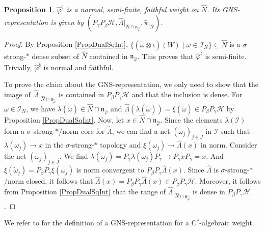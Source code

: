 \documentclass[pdftex]{sigma}
\numberwithin{equation}{section}
\newtheorem{prop}[thm]{Proposition}
\theoremstyle{definition}
\newcommand{\cHil}{\mathcal{H}}
\begin{document}
\begin{prop}\label{PropNSFWeightVNA}
 $\hat{\varphi}^\natural$  is a normal, semi-finite, faithful weight on $\hat{N}$. Its GNS-representation is given by $(P_\gamma P_\beta \cHil, \hat{\Lambda} \vert_{\hat{N} \cap \mathfrak{n}_{\hat{\varphi}}}, \hat{\pi}\vert_{\hat{N}})$.
\end{prop}
\begin{proof}
By Proposition \ref{PropDualSqInt}, $\{ (\tilde{\omega} \otimes \iota)(W) \mid \omega \in \mathcal{I}_N \} \subseteq \hat{N}$ is a $\sigma$-strong-$\ast$ dense subset of $\hat{N}$ contained in $\mathfrak{n}_{\hat{\varphi}}$. This proves that $\hat{\varphi}^\natural$ is semi-f\/inite. Trivially,  $\hat{\varphi}^\natural$ is normal and faithful.

 To prove the claim about the GNS-representation, we only need to show that the image of~$\hat{\Lambda} \vert_{\hat{N} \cap \mathfrak{n}_{\hat{\varphi}}}$ is contained in   $P_\beta P_\gamma \cHil$ and that the inclusion is dense.
For $\omega \in \mathcal{I}_N$, we have $\lambda(\tilde{\omega}) \in \hat{N} \cap \mathfrak{n}_{\hat{\varphi}}$ and $\hat{\Lambda}(\lambda(\tilde{\omega})) = \xi(\tilde{\omega}) \in P_\beta P_\gamma \cHil$ by Proposition \ref{PropDualSqInt}.  Now, let $x \in \hat{N} \cap \mathfrak{n}_{\hat{\varphi}}$. Since the elements $\lambda(\mathcal{I})$ form a $\sigma$-strong-$\ast$/norm core for $\hat{\Lambda}$, we can f\/ind a net $(\omega_j)_{j \in J}$ in $\mathcal{I}$ such that $\lambda(\omega_j) \rightarrow x$ in the $\sigma$-strong-$\ast$ topology and $\xi(\omega_j) \rightarrow \hat{\Lambda}(x)$ in norm.  Consider the net $(\tilde{\omega}_j)_{j \in J}$. We f\/ind $\lambda(\tilde{\omega}_j)  = P_\gamma \lambda(\omega_j) P_\gamma \rightarrow P_\gamma x P_\gamma = x$. And $\xi(\tilde{\omega}_j) = P_\beta P_\gamma \xi(\omega_j)$ is norm convergent to $ P_\beta P_\gamma \hat{\Lambda}(x)$. Since $\hat{\Lambda}$ is $\sigma$-strong-$\ast$/norm closed, it follows that $\hat{\Lambda}(x) =   P_\beta P_\gamma \hat{\Lambda}(x) \in P_\beta P_\gamma \cHil$. Moreover, it follows from Proposition \ref{PropDualSqInt} that the range of  $\hat{\Lambda} \vert_{\hat{N} \cap \mathfrak{n}_{\hat{\varphi}}}$ is dense in $P_\beta P_\gamma \cHil$.
\end{proof}

We refer to \cite[Section 1.1]{KusVae} for the def\/inition of a GNS-representation for a C$^\ast$-algebraic weight.
\end{document}

